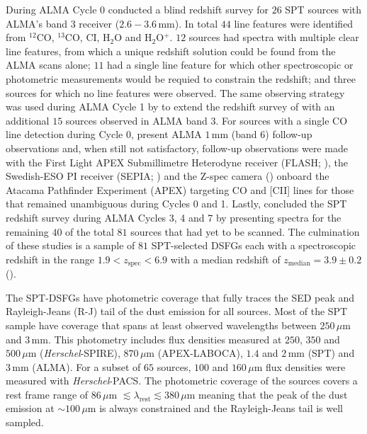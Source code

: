 During ALMA Cycle 0 \citealt{Weiss_2013} conducted a blind redshift survey for $26$ SPT sources with ALMA's band 3 receiver ($2.6 - 3.6\,$mm). In total $44$ line features were identified from $^{12}$CO, $^{13}$CO, CI, H$_2$O and H$_2$O$^+$. $12$ sources had spectra with multiple clear line features, from which a unique redshift solution could be found from the ALMA scans alone; $11$ had a single line feature for which other spectroscopic or photometric measurements would be requied to constrain the redshift; and three sources for which no line features were observed. The same observing strategy was used during ALMA Cycle 1 by \citealt{Strandet_2016} to extend the redshift survey of \citealt{Weiss_2013} with an additional $15$ sources observed in ALMA band 3. For sources with a single CO line detection during Cycle 0, \citealt{Strandet_2016} present ALMA $1\,$mm (band 6) follow-up observations and, when still not satisfactory, follow-up observations were made with the First Light APEX Submillimetre Heterodyne receiver (FLASH; \citealt{Heyminck_2006}), the Swedish-ESO PI receiver (SEPIA; \citealt{Billade_2012}) and the Z-spec camera (\citealt{Naylor_2003}) onboard the Atacama Pathfinder Experiment (APEX) targeting CO and [CII] lines for those that remained unambiguous during Cycles 0 and 1. Lastly, \citealt{Reuter_2020} concluded the SPT redshift survey during ALMA Cycles 3, 4 and 7 by presenting spectra for the remaining $40$ of the total $81$ sources that had yet to be scanned. The culmination of these studies is a sample of $81$ SPT-selected DSFGs each with a spectroscopic redshift in the range $1.9 < z_{\textrm{spec}} < 6.9$ with a median redshift of $z_{\textrm{median}} = 3.9\pm0.2$ (\citealt{Reuter_2020}).

The SPT-DSFGs have photometric coverage that fully traces the SED peak and Rayleigh-Jeans (R-J) tail of the dust emission for all sources. Most of the SPT sample have coverage that spans at least observed wavelengths between $250\,\mu$m and $3\,$mm. This photometry includes flux densities measured at $250$, $350$ and $500\,\mu$m (\textit{Herschel}-SPIRE), $870\,\mu$m (APEX-LABOCA), $1.4$ and $2\,$mm (SPT) and $3\,$mm (ALMA). For a subset of $65$ sources, $100$ and $160\,\mu$m flux densities were measured with \textit{Herschel}-PACS. The photometric coverage of the sources covers a rest frame range of $86\,\mu$m $\lesssim \lambda_{\textrm{rest}} \lesssim 380\,\mu$m meaning that the peak of the dust emission at $\sim 100\,\mu$m is always constrained and the Rayleigh-Jeans tail is well sampled.

